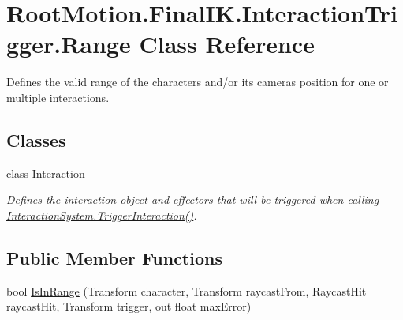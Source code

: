 \hypertarget{class_root_motion_1_1_final_i_k_1_1_interaction_trigger_1_1_range}{}\section{Root\+Motion.\+Final\+I\+K.\+Interaction\+Trigger.\+Range Class Reference}
\label{class_root_motion_1_1_final_i_k_1_1_interaction_trigger_1_1_range}


Defines the valid range of the character\textquotesingle{}s and/or it\textquotesingle{}s camera\textquotesingle{}s position for one or multiple interactions.  


\subsection*{Classes}
\begin{DoxyCompactItemize}
\item 
class \mbox{\hyperlink{class_root_motion_1_1_final_i_k_1_1_interaction_trigger_1_1_range_1_1_interaction}{Interaction}}
\begin{DoxyCompactList}\small\item\em Defines the interaction object and effectors that will be triggered when calling \mbox{\hyperlink{class_root_motion_1_1_final_i_k_1_1_interaction_system_a652cbce893d957ae9604d8ef8a99fe90}{Interaction\+System.\+Trigger\+Interaction()}}. \end{DoxyCompactList}\end{DoxyCompactItemize}
\subsection*{Public Member Functions}
\begin{DoxyCompactItemize}
\item 
bool \mbox{\hyperlink{class_root_motion_1_1_final_i_k_1_1_interaction_trigger_1_1_range_a856488211c1333a894738b8b2a290652}{Is\+In\+Range}} (Transform character, Transform raycast\+From, Raycast\+Hit raycast\+Hit, Transform trigger, out float max\+Error)
\end{DoxyCompactItemize}

